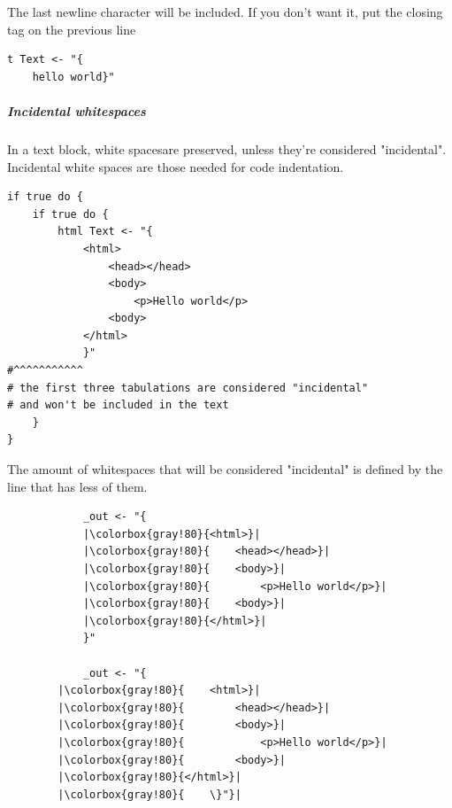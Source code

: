 The last newline character will be included. If you don't want it, put the
closing tag on the previous line

\begin{verbatim}
t Text <- "{
	hello world}"
\end{verbatim}

\subparagraph{Incidental whitespaces} In a text block, white
spaces\footnotemark[1] are preserved, unless they're considered
"incidental". Incidental white spaces are those needed for code indentation.


\begin{verbatim}
if true do {
	if true do {
		html Text <- "{
			<html>
				<head></head>
				<body>
					<p>Hello world</p>
				<body>
			</html>
			}"
#^^^^^^^^^^^
# the first three tabulations are considered "incidental"
# and won't be included in the text
	}
}
\end{verbatim}

\clearpage

The amount of whitespaces that will be considered "incidental" is defined by
the line that has less of them.

\begin{listing}
	\label{lst:textblock_incidental_whitespaces}
	\caption{A textblock with its actual content highlighted}
	\begin{verbatim}
			_out <- "{
			|\colorbox{gray!80}{<html>}|
			|\colorbox{gray!80}{	<head></head>}|
			|\colorbox{gray!80}{	<body>}|
			|\colorbox{gray!80}{		<p>Hello world</p>}|
			|\colorbox{gray!80}{	<body>}|
			|\colorbox{gray!80}{</html>}|
			}"

			_out <- "{
		|\colorbox{gray!80}{	<html>}|
		|\colorbox{gray!80}{		<head></head>}|
		|\colorbox{gray!80}{		<body>}|
		|\colorbox{gray!80}{			<p>Hello world</p>}|
		|\colorbox{gray!80}{		<body>}|
		|\colorbox{gray!80}{</html>}|
		|\colorbox{gray!80}{	\}"}|
	\end{verbatim}
\end{listing}


